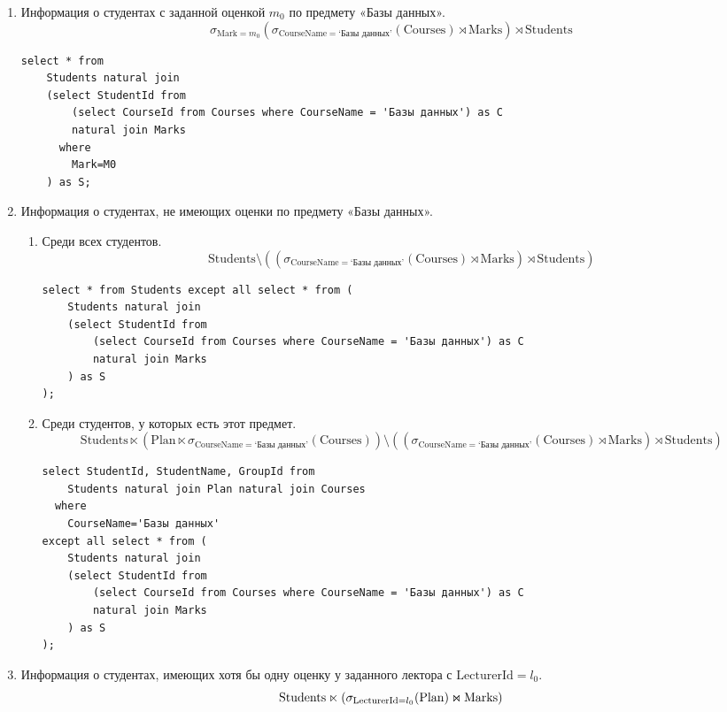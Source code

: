 \documentclass{article}
\newcommand{\Students}{\mathrm{Students}}
\newcommand{\Courses}{\mathrm{Courses}}
\newcommand{\CourseName}{\mathrm{CourseName}}
\newcommand{\Plan}{\mathrm{Plan}}
\newcommand{\LecturerId}{\mathrm{LecturerId}}
\newcommand{\Marks}{\mathrm{Marks}}
\newcommand{\Mark}{\mathrm{Mark}}
\newcommand{\join}{\mathbin{\mathrlap{\ltimes}{\rtimes}}}
\begin{document}
\begin{enumerate}
    \item Информация о студентах с заданной оценкой $m_0$ по предмету «Базы данных».
    \[
        \sigma_{\Mark = m_0}
        (\sigma_{\CourseName = \text{`Базы данных'}}(\Courses)
        \rtimes \Marks)
        \rtimes \Students
    \]
    \begin{verbatim}
select * from
    Students natural join
    (select StudentId from
        (select CourseId from Courses where CourseName = 'Базы данных') as C
        natural join Marks
      where
        Mark=M0
    ) as S;
    \end{verbatim}
    \item Информация о студентах, не имеющих оценки по предмету «Базы данных».
    \begin{enumerate}
        \item Среди всех студентов.
        \[
            \Students \setminus (
            (\sigma_{\CourseName = \text{`Базы данных'}}(\Courses)
            \rtimes \Marks)
            \rtimes \Students)
        \]
    \begin{verbatim}
select * from Students except all select * from (
    Students natural join
    (select StudentId from
        (select CourseId from Courses where CourseName = 'Базы данных') as C
        natural join Marks
    ) as S
);
    \end{verbatim}
        \item Среди студентов, у которых есть этот предмет.
        \[
            \Students \ltimes (
            \Plan \ltimes
            \sigma_{\CourseName = \text{`Базы данных'}}(\Courses))
            \setminus (
            (\sigma_{\CourseName = \text{`Базы данных'}}(\Courses)
            \rtimes \Marks)
            \rtimes \Students)
        \]
    \begin{verbatim}
select StudentId, StudentName, GroupId from
    Students natural join Plan natural join Courses
  where
    CourseName='Базы данных'
except all select * from (
    Students natural join
    (select StudentId from
        (select CourseId from Courses where CourseName = 'Базы данных') as C
        natural join Marks
    ) as S
);
    \end{verbatim}
    \end{enumerate}
    \item Информация о студентах, имеющих хотя бы одну оценку у заданного
        лектора с $\LecturerId=l_0$.
    \[
        \Students \ltimes (\sigma_{\LecturerId = l_0}(\Plan) \join \Marks)
\]
\end{enumerate}
\end{document}
